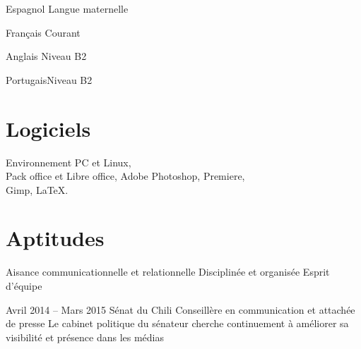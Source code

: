 \documentclass[30pt, french]{tccv}
\begin{document}
\begin{upshape}
\begin{competence}
\begin{factlist}
\item{Espagnol} {Langue maternelle}	
\item{Français} {Courant}	
\item{Anglais}  {Niveau B2}	
\item{Portugais}{Niveau B2}
\end{factlist}

\vspace{0.5cm}
\section{Logiciels}
Environnement PC et Linux, \\
Pack office et Libre office,
Adobe Photoshop, Premiere, \\
Gimp,
\LaTeX.

\vspace{0.5cm}
\section{Aptitudes}
\begin{itemize}[leftmargin=13pt]
  \setlength\itemsep{-3pt} 
  \cvitem[\checkmark]  Aisance communicationnelle et relationnelle 
  \cvitem[\checkmark]  Disciplinée et organisée 
  \cvitem[\checkmark]  Esprit d'équipe 
\end{itemize}



\end{competence}




%
%


\begin{experience}



\setlength{\parskip}{0pt}
\item{\color{text} Avril 2014 -- Mars 2015}
     {Sénat du Chili}
     {Conseillère en communication et attachée de presse}
     \fontsize{9pt}{1em}\color{text}\bodyfontlight\upshape\selectfont
%
 Le cabinet politique du sénateur  cherche continuement à améliorer sa visibilité et présence dans les médias \\ 


\end{experience}
\end{upshape}
\end{document}

